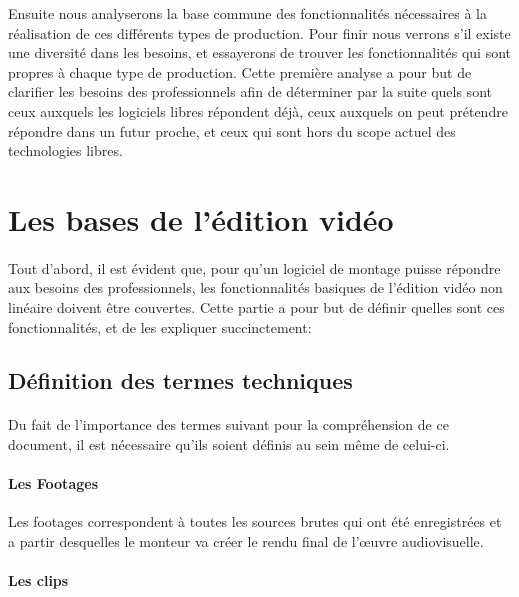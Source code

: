 Ensuite nous analyserons la base commune des fonctionnalités nécessaires
à la réalisation de ces différents types de production.  Pour finir
nous verrons s'il existe une diversité dans les besoins, et essayerons
de trouver les fonctionnalités qui sont propres à chaque type de
production. Cette première analyse a pour but de clarifier les besoins
des professionnels afin de déterminer par la suite quels sont ceux
auxquels les logiciels libres répondent déjà, ceux auxquels on peut
prétendre répondre dans un futur proche, et ceux qui sont hors du
scope actuel des technologies libres.

\newpage

\section{Les bases de l'édition vidéo}

\paragraph{}

Tout d'abord, il est évident que, pour qu'un logiciel de montage
puisse répondre aux besoins des professionnels, les fonctionnalités
basiques de l'édition vidéo non linéaire doivent être couvertes.
Cette partie a pour but de définir quelles sont ces fonctionnalités,
et de les expliquer succinctement:

\subsection{Définition des termes techniques}

\paragraph {}

Du fait de l'importance des termes suivant pour la compréhension de
ce document, il est nécessaire qu'ils soient définis au sein même
de celui-ci.

\paragraph{Les Footages}

Les footages correspondent à toutes les sources brutes qui ont été
enregistrées et a partir desquelles le monteur va créer le rendu final
de l'œuvre audiovisuelle.

\paragraph{Les clips}

